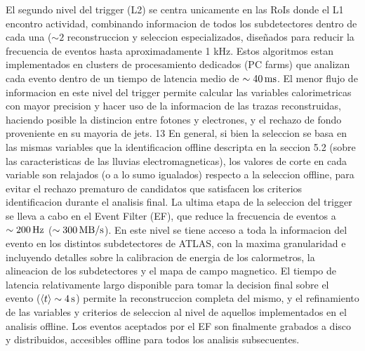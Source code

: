 El segundo nivel del trigger (L2) se centra unicamente en las RoIs donde el L1
encontro actividad, combinando informacion de todos los subdetectores dentro de cada una
($\sim 2$ %
reconstruccion y seleccion especializados, dise\~nados para reducir la frecuencia de
eventos hasta aproximadamente 1 kHz. Estos algoritmos estan implementados en clusters de
procesamiento dedicados (PC farms) que analizan cada evento dentro de un tiempo de
latencia medio de $\sim \unit[40]{ms}$. El menor flujo de informacion en este nivel del trigger permite
calcular las variables calorimetricas con mayor precision y hacer uso de la informacion
de las trazas reconstruidas, haciendo posible la distincion entre fotones y electrones,
y el rechazo de fondo proveniente en su mayoria de jets. 13 En general, si bien la
seleccion se basa en las mismas variables que la identificacion offline descripta en la
seccion 5.2 (sobre las caracteristicas de las lluvias electromagneticas), los valores
de corte en cada variable son relajados (o a lo sumo igualados) respecto a la seleccion
offline, para evitar el rechazo prematuro de candidatos que satisfacen los criterios
identificacion durante el analisis final.
La ultima etapa de la seleccion del trigger se lleva a cabo en el Event Filter (EF), que
reduce la frecuencia de eventos a $\sim \unit[200]{Hz}$ ($\sim \unit[300]{MB/s}$).
En este nivel se tiene acceso a toda la informacion del evento en los distintos subdetectores
de ATLAS, con la
maxima granularidad e incluyendo detalles sobre la calibracion de energia de los calormetros,
la alineacion de los subdetectores y el mapa de campo magnetico. El tiempo de latencia
relativamente largo disponible para tomar la decision final sobre el evento ($\avg{t} \sim \unit[4]{s}$)
permite la reconstruccion completa del mismo, y el refinamiento de las variables y criterios
de seleccion al nivel de aquellos implementados en el analisis offline. Los eventos aceptados
por el EF son finalmente grabados a disco y distribuidos, accesibles offline para todos los
analisis subsecuentes.

